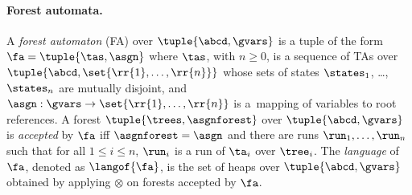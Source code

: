 {%
\paragraph{Forest automata.}

A \emph{forest automaton} (FA) over $\tuple{\abcd, \gvars}$ is a tuple of the
form $\fa = \tuple{\tas, \asgn}$ where $\tas$, with $n \geq 0$, is a sequence of TAs
over $\tuple{\abcd, \set{\rr{1}, \ldots , \rr{n}}}$ whose sets
of states $\states_1$, \dots, $\states_n$ are mutually disjoint, and $\asgn:
\gvars \to \set{\rr{1}, \ldots , \rr{n}}$ is a~mapping of variables to
root references.
%
A forest $\tuple{\trees, \asgnforest}$ over $\tuple{\abcd,\gvars}$ is
\emph{accepted} by $\fa$ iff $\asgnforest = \asgn$ and there are runs $\run_1, \dots, \run_n$ such that
for all $1 \leq i \leq n$, $\run_i$ is a run of $\ta_i$ over $\tree_i$.
%
%
%
%
The \emph{language} of~$\fa$, denoted as $\langof{\fa}$, is the set of heaps
over $\tuple{\abcd, \gvars}$ obtained by applying $\otimes$ on
forests accepted by $\fa$.


}
